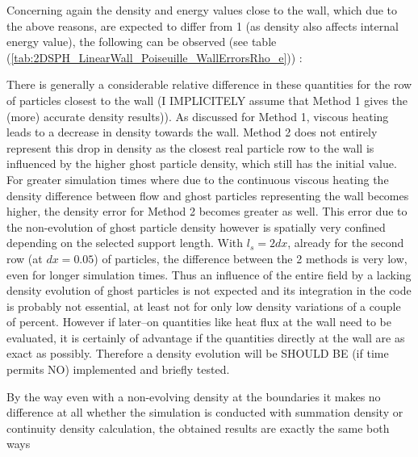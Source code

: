 \documentclass{report}
\begin{document}
Concerning again the density and energy values close to the wall, which due to the above reasons, are expected to differ from 1 (as density also affects internal energy value), the following can be observed (see table (\ref{tab:2DSPH_LinearWall_Poiseuille_WallErrorsRho_e})) : 

There is generally a considerable relative difference in these quantities for the row of particles closest to the wall (I IMPLICITELY assume that Method 1 gives the (more) accurate density results)). As discussed for Method 1, viscous heating leads to a decrease in density towards the wall. Method 2 does not entirely represent this drop in density as the closest real particle row to the wall is influenced by the higher ghost particle density, which still has the initial value. For greater simulation times where due to the continuous viscous heating the density difference between flow and ghost particles representing the wall becomes higher, the density error for Method 2 becomes greater as well. 
This error due to the non-evolution of ghost particle density however is spatially very confined depending on the selected support length. With $l_s=2dx$, already for the second row (at $dx=0.05$) of particles, the difference between the 2 methods is very low, even for longer simulation times.
Thus an influence of the entire field by a lacking density evolution of ghost particles is not expected and its integration in the code is probably not essential, at least not for only low density variations of a couple of percent. However if later--on quantities like heat flux at the wall need to be evaluated, it is certainly of advantage if the quantities directly at the wall are as exact as possibly. Therefore a density evolution will be SHOULD BE (if time permits NO) implemented and briefly tested.

By the way even with a non-evolving density at the boundaries it makes no difference at all whether the simulation is conducted with summation density or continuity density calculation, the obtained results are exactly the same both ways

\end{document}
